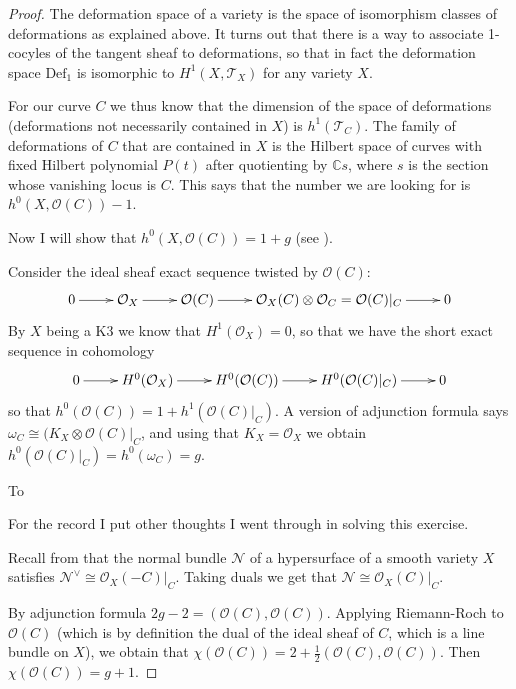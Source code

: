 \begin{proof}
The deformation space of a variety is the space of isomorphism classes of
deformations as explained above. It turns out that there is a way to associate
1-cocyles of the tangent sheaf to deformations, so that in fact the deformation
space $\text{Def}_1$ is isomorphic to $H^{1}(X,\mathcal{T}_X)$ for any variety
$X$.

For our curve $C$ we thus know that the dimension of the space of deformations
(deformations not necessarily contained in $X$) is $h^1(\mathcal{T}_C)$.  The
family of deformations of $C$ that are contained in $X$ is the Hilbert space of
curves with fixed Hilbert polynomial $P(t)$ after quotienting by $\mathbb{C}s$,
where $s$ is the section whose vanishing locus is  $C$. 
This says that the number we are looking for is $h^{0}(X,\mathcal{O}(C))-1$.

Now I will show that $h^0(X,\mathcal{O}(C))=1+g$ (see 
\cite[Lemma 1.2.1, Remark 1.2.2]{huk}).

Consider the ideal sheaf exact sequence twisted by
$\mathcal{O}(C)$:
$$
\xymatrix{
0\ar[r]&\mathcal{O}_X\ar[r]&\mathcal{O}(C)\ar[r]
&\mathcal{O}_X(C) \otimes \mathcal{O}_C=\mathcal{O}(C)|_{C}\ar[r]&0
}
$$
By $X$ being a K3 we know that $H^{1}(\mathcal{O}_X)=0$, so that we have the
short exact sequence in cohomology
$$
\xymatrix{
0\ar[r]&H^{0}(\mathcal{O}_X)\ar[r]&H^{0}(\mathcal{O}(C))\ar[r]
&H^{0}(\mathcal{O}(C)|_{C})\ar[r]&0
}
$$
so that $h^0(\mathcal{O}(C))=1+h^1(\mathcal{O}(C)|_{C})$. 
A version of adjunction formula says
$\omega_C \cong (K_X \otimes\mathcal{O}(C)|_{C}$, and using that 
$K_X=\mathcal{O}_X$ we obtain $h^0(\mathcal{O}(C)|_{C})=h^0(\omega_C)=g$.

To 

\medskip\noindent
For the record I put other thoughts I went through in solving this exercise.

Recall from \cite[p. 146]{gri} that the normal bundle
$\mathcal{N}$ of a hypersurface of a smooth variety $X$ satisfies
$\mathcal{N}^\vee\cong\mathcal{O}_X(-C)|_{C}$. Taking duals we get that
$\mathcal{N}\cong\mathcal{O}_X(C)|_{C}$.

By adjunction formula $2g-2=(\mathcal{O}(C),\mathcal{O}(C))$. 
Applying Riemann-Roch
to $\mathcal{O}(C)$ (which is by definition the dual of the ideal sheaf of $C$,
which is a line bundle on $X$), we obtain that
$\chi(\mathcal{O}(C))=2+\frac{1}{2}(\mathcal{O}(C),\mathcal{O}(C))$. Then
$\chi(\mathcal{O}(C))=g+1$.


\end{proof}
